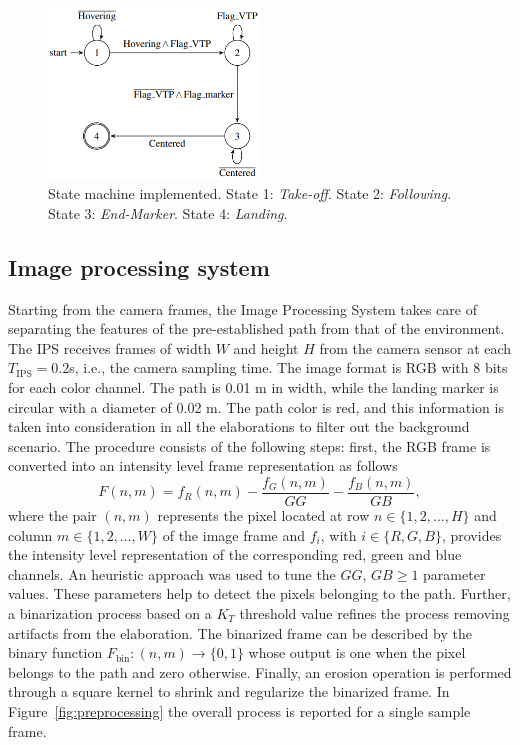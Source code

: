 \documentclass[a4paper,twocolumn,10pt]{article}
\begin{document}
    \begin{figure}
        \centering
        \includegraphics[width=0.5\textwidth]{pics/fig5_lines.png}
        \caption{State machine implemented. State 1: \textit{Take-off}. State 2: \textit{Following}. State 3: \textit{End-Marker}. State 4: \textit{Landing}.} 
        \label{fig:state machine}
    \end{figure} 

    \subsection{Image processing system}
    \label{sec:imageProcessingSystem}

    Starting from the camera frames, the Image Processing System takes care of separating the features of the 
    pre-established path from that of the environment.
    The IPS receives frames of width $W$ and height $H$ from the camera sensor at each   
    $T_\mathrm{IPS} = 0.2$s, i.e., the camera sampling time. The image format is RGB with 
    $8$ bits for each color channel. The path is 0.01 m in width, while the landing marker 
    is circular with a diameter of 0.02 m. The path color is red, and this information is 
    taken into consideration in all the elaborations to filter out the background scenario. The 
    procedure consists of the following steps: first, the RGB frame is converted into an intensity 
    level frame representation as follows 
    \begin{equation}
        F(n,m)=f_R(n,m) -  \frac{f_G(n,m)}{GG} - \frac{f_B(n,m)}{GB} ,
    \end{equation}
    where the pair $(n,m)$ represents the pixel located at row $n \in \{1, 2, \dots, H\}$ and column $m 
    \in \{1, 2, \dots, W\}$ of the image frame and $f_i$, with $i \in \{R, G, B\}$, provides the 
    intensity level representation of the corresponding red, green and blue channels. An heuristic 
    approach was used to tune the $GG$, $GB \geq 1$ parameter values. These parameters help to detect 
    the pixels belonging to the path. Further, a binarization process based on a $K_T$  threshold value 
    refines the process removing artifacts from the elaboration. The binarized frame can be described 
    by the binary function $F_\mathrm{bin} \colon (n,m) \to \{0, 1\}$ whose output is one when the 
    pixel belongs to the path and zero otherwise. Finally, an erosion operation is performed through a 
    square kernel to shrink and regularize the binarized frame. In Figure~\ref{fig:preprocessing} the 
    overall process is reported for a single sample frame.
\end{document}
